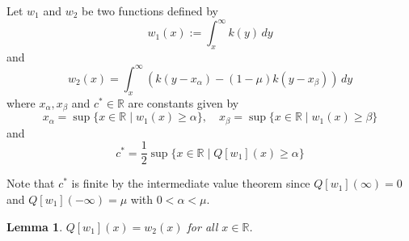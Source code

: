 \documentclass[11pt]{article}
\newtheorem{lem}[thm]{Lemma}
\newtheorem{prop}[thm]{Proposition}
\theoremstyle{definition}
\numberwithin{equation}{section}
\numberwithin{thm}{section}
\renewcommand{\a}{\alpha}
\renewcommand{\b}{\beta}
\newcommand{\m}{\mu}
\begin{document}
%

 Let $w_1$ and $w_2$ be two functions defined by
\begin{equation} \label{w1}
w_1(x) := \int_x^\infty k(y) \, dy
\end{equation}
and
\begin{equation} \label{w2}
w_2(x) = \int_x^\infty \left( k(y-x_\a) - (1-\mu)k(y-x_\b)\right) \, dy 
\end{equation} 
where $x_\a,x_\b$ and $c^* \in \mathbb R$ are constants given by
\begin{equation}
x_\a =\sup\{x\in\mathbb R\mid w_1(x)\geq\a\}, \quad
x_\b =\sup\{x\in\mathbb R\mid w_1(x)\geq\b\}
\end{equation}
and
\begin{equation}
c^*=\frac{1}{2}\sup\{x\in\mathbb R\mid Q[w_1](x)\geq\a\}
\end{equation}


Note that $c^*$ is finite by the intermediate value theorem since $Q[w_1](\infty)=0$ and $Q[w_1](-\infty)=\m$ with $0<\a<\m$.






\begin{lem} \label{lemma0.5}
$Q[w_1](x) = w_2(x)$ for all $x\in\mathbb R$.
\end{lem}
\end{document}
